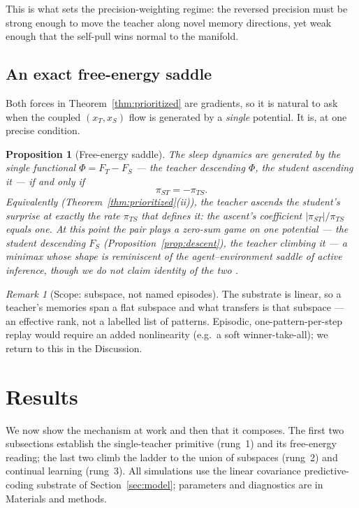 \documentclass[10pt,letterpaper]{article}
\theoremstyle{plain}
\newtheorem{proposition}{Proposition}
\theoremstyle{remark}
\newtheorem{remark}{Remark}
\newcommand{\xT}{x_T}
\newcommand{\xS}{x_S}
\newcommand{\FS}{F_S}
\newcommand{\FT}{F_T}
\newcommand{\piTS}{\pi_{TS}}
\newcommand{\piST}{\pi_{ST}}
\begin{document}
This is what sets the precision-weighting regime: the reversed precision must be strong enough to move
the teacher along novel memory directions, yet weak enough that the self-pull wins normal to the
manifold.

\subsection{An exact free-energy saddle}
Both forces in Theorem~\ref{thm:prioritized} are gradients, so it is natural to ask when the coupled
$(\xT,\xS)$ flow is generated by a \emph{single} potential. It is, at one precise condition.

\begin{proposition}[Free-energy saddle]
\label{prop:saddle}
The sleep dynamics are generated by the single functional $\Phi=\FT-\FS$ --- the teacher descending
$\Phi$, the student ascending it --- if and only if
\begin{equation}
\label{eq:saddle}
\piST=-\piTS.
\end{equation}
Equivalently (Theorem~\ref{thm:prioritized}(ii)), the teacher ascends the student's surprise at exactly
the rate $\piTS$ that defines it: the ascent's coefficient $|\piST|/\piTS$ equals one. At this point the
pair plays a zero-sum game on one potential --- the student descending $\FS$
(Proposition~\ref{prop:descent}), the teacher climbing it --- a minimax whose shape is reminiscent of
the agent--environment saddle of active inference, though we do not claim identity of the two
\cite{friston2017process,millidge2021whence}.
\end{proposition}

\begin{remark}[Scope: subspace, not named episodes]
\label{rem:scope}
The substrate is linear, so a teacher's memories span a flat subspace and what transfers is that
subspace --- an effective rank, not a labelled list of patterns. Episodic, one-pattern-per-step replay
would require an added nonlinearity (e.g.\ a soft winner-take-all); we return to this in the Discussion.
\end{remark}

\section{Results}
We now show the mechanism at work and then that it composes. The first two subsections establish the
single-teacher primitive (rung~1) and its free-energy reading; the last two climb the ladder to the
union of subspaces (rung~2) and continual learning (rung~3). All simulations use the linear covariance
predictive-coding substrate of Section~\ref{sec:model}; parameters and diagnostics are in Materials and
methods.
\end{document}
